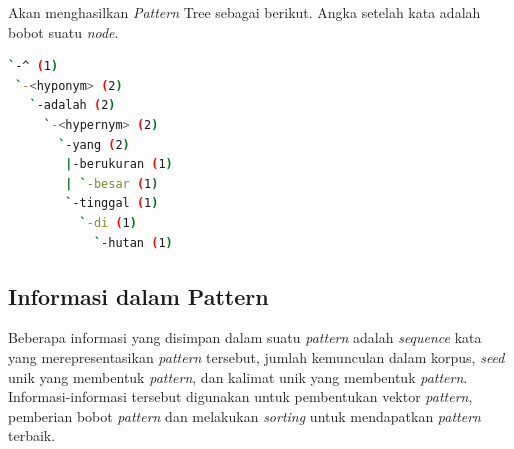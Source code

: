\noindent Akan menghasilkan \textit{Pattern} Tree sebagai berikut. Angka setelah kata adalah bobot suatu \textit{node}.
\begin{lstlisting}[language=bash]
`-^ (1)
 `-<hyponym> (2)
   `-adalah (2)
     `-<hypernym> (2)
       `-yang (2)
        |-berukuran (1)
        | `-besar (1)
        `-tinggal (1)
          `-di (1)
            `-hutan (1)
\end{lstlisting}

\subsection{Informasi dalam Pattern}
Beberapa informasi yang disimpan dalam suatu \textit{pattern} adalah \textit{sequence} kata yang merepresentasikan \textit{pattern} tersebut, jumlah kemunculan dalam korpus, \textit{seed} unik yang membentuk \textit{pattern}, dan kalimat unik yang membentuk \textit{pattern}. Informasi-informasi tersebut digunakan untuk pembentukan vektor \textit{pattern}, pemberian bobot \textit{pattern} dan melakukan \textit{sorting} untuk mendapatkan \textit{pattern} terbaik.

